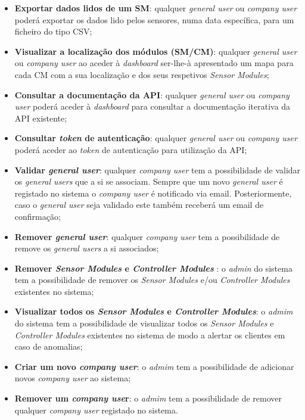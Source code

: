 \begin{itemize}
	\item \textbf{Exportar dados lidos de um \acl{SM}}: qualquer \textit{general user} ou \textit{company user} poderá exportar os dados lido pelos sensores, numa data específica, para um ficheiro do tipo \ac{CSV}; 
	
	\item \textbf{Visualizar a localização dos módulos (\acl{SM}/\acl{CM})}: qualquer \textit{general user} ou \textit{company user} ao aceder à \textit{dashboard} ser-lhe-à apresentado um mapa para cada \acl{CM} com a sua localização e dos seus respetivos \textit{Sensor Modules}; 
	
	
	\item \textbf{Consultar a documentação da API}: qualquer \textit{general user} ou \textit{company user} poderá aceder à \textit{dashboard} para consultar a documentação iterativa da \ac{API} existente; 
		
	\item \textbf{Consultar \textit{token} de autenticação}: qualquer \textit{general user} ou \textit{company user} poderá aceder ao \textit{token} de autenticação para utilização da \ac{API}; 
	

	
	\item \textbf{Validar \textit{general user}}: qualquer \textit{company user} tem a possibilidade de validar os \textit{general users} que a si se associam. Sempre que um novo \textit{general user} é registado no sistema o \textit{company user} é notificado via email. Posteriormente, caso o \textit{general user} seja validado este também receberá um email de confirmação;  
	
	\item \textbf{Remover \textit{general user}}: qualquer \textit{company user} tem a possibilidade de remove os \textit{general users} a si associados; 
	
	
	\item \textbf{Remover \textit{Sensor Modules} e \textit{Controller Modules} }: o \textit{admin} do sistema tem a possibilidade de remover os \textit{Sensor Modules} e/ou \textit{Controller Modules} existentes no sistema; 
	
	
	\item \textbf{Visualizar todos os \textit{Sensor Modules} e \textit{Controller Modules}}: o \textit{admim} do sistema tem a possibilidade de visualizar todos os \textit{Sensor Modules} e \textit{Controller Modules} existentes no sistema de modo a alertar os clientes em caso de anomalias;
	
	
	\item \textbf{Criar um novo \textit{company user}}: o \textit{admim} tem a possibilidade de adicionar novos \textit{company user} ao sistema; 
	
	\item \textbf{Remover um \textit{company use}r}: o \textit{admim} tem a possibilidade de remover qualquer \textit{company user} registado no sistema.
	
	
\end{itemize}









